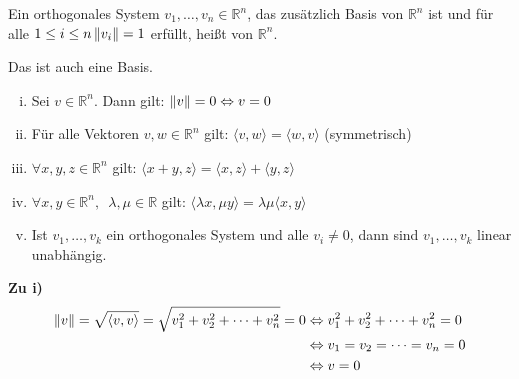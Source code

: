 Ein orthogonales System $v_1,\dots,v_n \in \mathbb{R}^n$, das zusätzlich Basis von $\mathbb{R}^n$ ist und für alle $1\leq i\leq n \left\lVert v_i\right\rVert = 1$ erfüllt, heißt  von $\mathbb{R}^n$.

\begin{center}
\end{center}
Das ist auch eine Basis.

\begin{enumerate}[i)]
  \item{Sei $v \in \mathbb{R}^n$. Dann gilt: $\left\lVert v\right\rVert = 0 \Leftrightarrow v = 0$}
  \item{Für alle Vektoren $v, w \in \mathbb{R}^n$ gilt: $\langle v, w\rangle = \langle w, v\rangle$ (\glqq{}symmetrisch\grqq{})}
  \item{$\forall x, y, z \in \mathbb{R}^n$ gilt: $\langle x+y, z\rangle = \langle x, z\rangle + \langle y, z\rangle$}
  \item{$\forall x, y \in \mathbb{R}^n,\enspace \lambda, \mu \in \mathbb{R}$ gilt: $\langle\lambda x, \mu y\rangle = \lambda\mu\langle x, y\rangle$}
  \item{Ist $v_1,\dots,v_k$ ein orthogonales System und alle $v_i \neq 0$, dann sind $v_1,\dots,v_k$ linear unabhängig.}
\end{enumerate}

\textbf{Zu i)}
\begin{align*}
	\left\lVert v\right\rVert = \sqrt{\langle v, v\rangle} = \sqrt{v_1^2+v_2^2+\dots +v_n^2} = 0 &\Leftrightarrow v_1^2+v_2^2+\dots +v_n^2 = 0 \\
	&\Leftrightarrow v_1 = v_2 = \dots = v_n = 0 \\
	&\Leftrightarrow v = 0
\end{align*}

